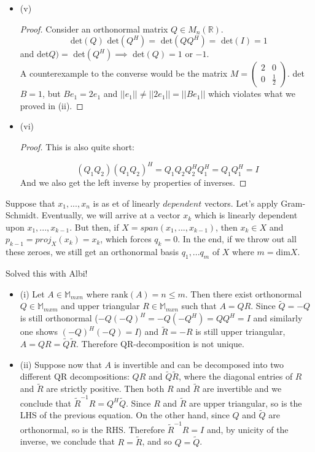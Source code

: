 \documentclass[12pt]{article}
\newenvironment{problem}[2][Problem]{\begin{trivlist}
\item[\hskip \labelsep {\bfseries #1}\hskip \labelsep {\bfseries #2.}]}{\end{trivlist}}
\theoremstyle{definition}
\theoremstyle{definition}
\theoremstyle{definition}
\theoremstyle{definition}
\begin{document}
\begin{problem}{3.10}
\begin{itemize}
\begin{proof}
$$\langle \bar{Q_i}, q_j \rangle = \delta_{ij} $$
and the columns of $Q$ are orthonormal.
\end{proof}
\item (v) 
\begin{proof}
Consider an orthonormal matrix $Q \in M_n(\mathbb{R})$. 
$$ \text{ det}(Q) \text{ det}(Q^H) = \text{ det}(QQ^H) = \text{ det}(I) = 1 
$$
and det$Q) =$ det$(Q^H) \implies$ det$(Q) = 1$ or $-1$. \\
A counterexample to the converse would be the matrix $M = (\begin{smallmatrix} 2 & 0 \\ 0 & \frac{1}{2} \end{smallmatrix}) $. det $B = 1$, but $Be_1 = 2e_1$ and $||e_1|| \neq ||2e_1|| = ||Be_1||$ which violates what we proved in (ii).
\end{proof}
\item(vi) \begin{proof}
This is also quite short:

$$
(Q_1Q_2)(Q_1Q_2)^H = Q_1Q_2Q_2^HQ_1^H = Q_1Q_1^H = I
$$
And we also get the left inverse by properties of inverses.
\end{proof}
\end{itemize}
\end{problem}
\begin{problem}{3.11}
Suppose that $x_1, ... , x_n$ is as et of linearly $\textit{dependent}$ vectors. Let's apply Gram-Schmidt. Eventually, we will arrive at a vector $x_k$ which is linearly dependent upon $x_1, ..., x_{k-1}$. But then, if $X = span(x_1, ..., x_{k-1}) $, then $x_k \in X$ and $p_{k-1} = proj_X(x_k) = x_k$, which forces $q_k = 0$. In the end, if we throw out all these zeroes, we still get an orthonormal basis $q_1, ... q_m$ of $X$ where $m = \text{dim} X$. 
\end{problem}


\begin{problem}{3.16} Solved this with Albi!
\begin{itemize}
\item (i) Let $A\in\mathbb M_{mxn}$ where $\text{rank}(A)=n\leq m$.
Then there exist orthonormal $Q\in\mathbb M_{mxm}$ and
upper triangular $R\in\mathbb M_{mxn}$ such that $A=QR$.
Since $\tilde{Q}=-Q$ is still orthonormal ($-Q(-Q)^H=-Q(-Q^H)=QQ^H=I$ 
and similarly one shows $(-Q)^H(-Q)=I$)
and $\tilde{R}=-R$ is still upper triangular, 
$A=QR=\tilde{Q}\tilde{R}$.
Therefore QR-decomposition is not unique.
\item (ii) Suppose now that $A$ is invertible and can be decomposed into 
two different QR decompositions: $QR$ and $\tilde{Q}\tilde{R}$,
where the diagonal entries of $R$ and $\tilde{R}$ are strictly positive.
Then both $R$ and $\tilde{R}$ are invertible and we conclude that
$\tilde{R}^{-1}R=Q^H\tilde{Q}$.
Since $R$ and $\tilde{R}$ are upper triangular, so is the LHS of the previous equation.
On the other hand, since $Q$ and $\tilde{Q}$ are orthonormal, so is the RHS.
Therefore $\tilde{R}^{-1}R=I$ and, by unicity of the inverse, we conclude that $R=\tilde{R}$,
and so $Q=\tilde{Q}$.
\end{itemize}
\end{problem}
\end{document}
